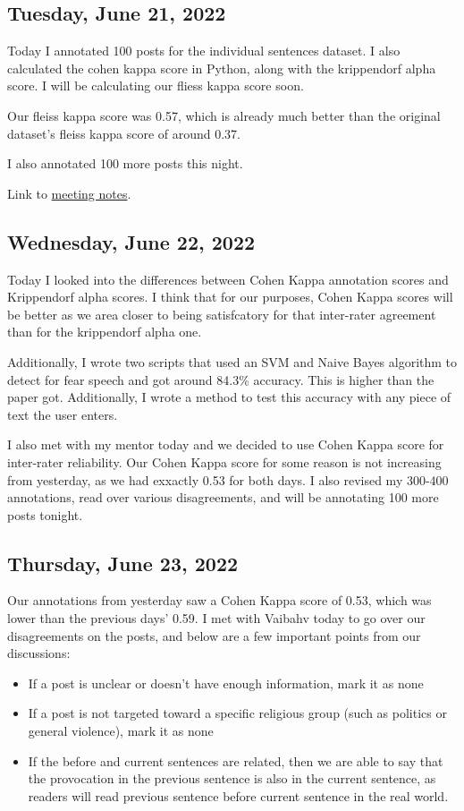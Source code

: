 \documentclass[11pt,letterpaper]{article}
\begin{document}
\subsection{Tuesday, June 21, 2022}
Today I annotated 100 posts for the individual sentences dataset. I also calculated the cohen kappa score in Python, along with the krippendorf alpha score. I will be calculating our fliess kappa score soon.

Our fleiss kappa score was 0.57, which is already much better than the original dataset's fleiss kappa score of around 0.37.

I also annotated 100 more posts this night.

Link to \href{https://docs.google.com/document/d/1RadyoYOYbrsICxQLE5TTWOezY15mMqB6Yd6E3F3n8PI/edit?usp=sharing}{meeting notes}.


\subsection{Wednesday, June 22, 2022}
Today I looked into the differences between Cohen Kappa annotation scores and Krippendorf alpha scores. I think that for our purposes, Cohen Kappa scores will be better as we area closer to being satisfcatory for that inter-rater agreement than for the krippendorf alpha one.

Additionally, I wrote two scripts that used an SVM and Naive Bayes algorithm to detect for fear speech and got around 84.3\% accuracy. This is higher than the paper got. Additionally, I wrote a method to test this accuracy with any piece of text the user enters.

I also met with my mentor today and we decided to use Cohen Kappa score for inter-rater reliability. Our Cohen Kappa score for some reason is not increasing from yesterday, as we had exxactly 0.53 for both days. I also revised my 300-400 annotations, read over various disagreements, and will be annotating 100 more posts tonight.


\subsection{Thursday, June 23, 2022}
Our annotations from yesterday saw a Cohen Kappa score of 0.53, which was lower than the previous days' 0.59. I met with Vaibahv today to go over our disagreements on the posts, and below are a few important points from our discussions:
\begin{itemize}
    \item If a post is unclear or doesn't have enough information, mark it as none
    \item If a post is not targeted toward a specific religious group (such as politics or general violence), mark it as none
    \item If the before and current sentences are related, then we are able to say that the provocation in the previous sentence is also in the current sentence, as readers will read previous sentence before current sentence in the real world.
\end{itemize}
\end{document}
